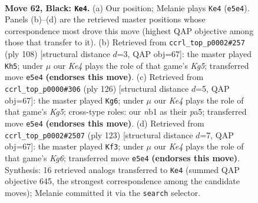 \documentclass[11pt]{article}
\begin{document}
\clearpage

\begin{figure}[p]\centering
\begin{subfigure}{0.46\textwidth}\centering
\resizebox{\linewidth}{!}{%
\newchessgame
\chessboard[
  setfen={8/6B1/p7/4k3/2p3b1/8/5K2/1N6 b - - 23 62},
  showmover=false,
  pgfstyle=straightmove, color=movearrow, markmove={e5-e4}
]}
\caption{}
\end{subfigure}\hfill
\begin{subfigure}{0.46\textwidth}\centering
\resizebox{\linewidth}{!}{%
\newchessgame
\chessboard[
  setfen={8/8/4k3/1P4K1/8/4b3/2B1P3/8 w - - 1 55},
  showmover=false,
  pgfstyle=straightmove, color=movearrow, markmove={g5-h5}
]}
\caption{}
\end{subfigure}
\\[4pt]
\begin{subfigure}{0.46\textwidth}\centering
\resizebox{\linewidth}{!}{%
\newchessgame
\chessboard[
  setfen={8/4b3/8/p3k1K1/P7/8/6B1/8 w - - 15 64},
  showmover=false,
  pgfstyle=straightmove, color=movearrow, markmove={g5-g6}
]}
\caption{}
\end{subfigure}\hfill
\begin{subfigure}{0.46\textwidth}\centering
\resizebox{\linewidth}{!}{%
\newchessgame
\chessboard[
  setfen={2n5/8/8/1P2B3/p7/6k1/3K4/8 b - - 8 62},
  showmover=false,
  pgfstyle=straightmove, color=movearrow, markmove={g3-f3}
]}
\caption{}
\end{subfigure}
\caption{\textbf{Move 62, Black: \texttt{Ke4}.} (a) Our position; Melanie plays \texttt{Ke4} (\texttt{e5e4}). Panels (b)--(d) are the retrieved master positions whose correspondence most drove this move (highest QAP objective among those that transfer to it). (b) Retrieved from \texttt{ccrl\_top\_p0002\#257} (ply 108) [structural distance $d$=3, QAP obj=67]: the master played \texttt{Kh5}; under $\mu$ our \emph{Ke4} plays the role of that game's \emph{Kg5}; transferred move \texttt{e5e4} \textbf{(endorses this move)}. (c) Retrieved from \texttt{ccrl\_top\_p0000\#306} (ply 126) [structural distance $d$=5, QAP obj=67]: the master played \texttt{Kg6}; under $\mu$ our \emph{Ke4} plays the role of that game's \emph{Kg5}; cross-type roles: our \emph{n}b1 as their \emph{p}a5; transferred move \texttt{e5e4} \textbf{(endorses this move)}. (d) Retrieved from \texttt{ccrl\_top\_p0002\#2507} (ply 123) [structural distance $d$=7, QAP obj=67]: the master played \texttt{Kf3}; under $\mu$ our \emph{Ke4} plays the role of that game's \emph{Kg6}; transferred move \texttt{e5e4} \textbf{(endorses this move)}. Synthesis: 16 retrieved analogs transferred to \texttt{Ke4} (summed QAP objective 645, the strongest correspondence among the candidate moves); Melanie committed it via the \texttt{search} selector.}
\label{fig:thought-m123}
\end{figure}
\end{document}
